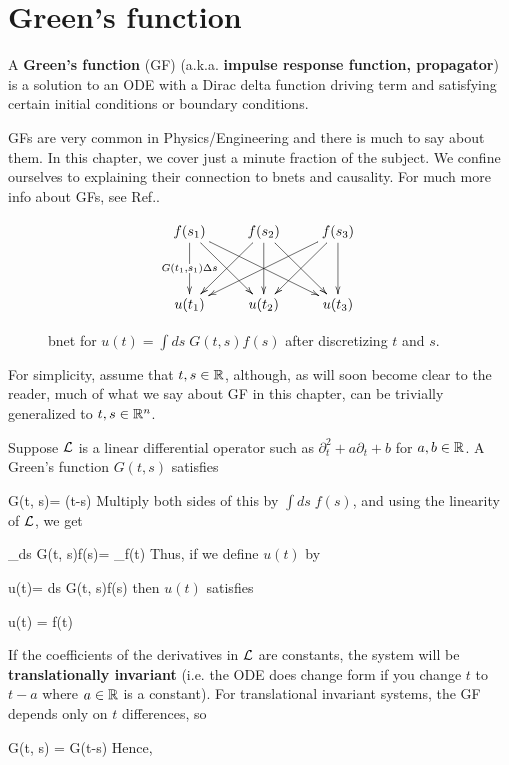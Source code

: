 \chapter{Green's function}
\label{ch-greens-fun}


A {\bf Green's function} (GF)
(a.k.a. {\bf impulse response
 function, propagator}) is a solution to an ODE 
 with a Dirac delta function driving term and satisfying certain
 initial conditions or boundary conditions. 
 
GFs are very common in Physics/Engineering and there is much
to say about them. In this chapter, we cover
just a minute fraction of the subject. We confine ourselves
to explaining their connection to bnets  and causality.
For much more info about GFs, see Ref.\cite{wiki-greens-fun}.

\begin{figure}[h!]
$$
\xymatrix@R=3pc{
f(s_1)\ar[d]|{G(t_1, s_1)\Delta s}
\ar[dr]\ar[drr]
&f(s_2)\ar[dl]\ar[d]\ar[dr]
&f(s_3)\ar[dll]\ar[dl]\ar[d]
\\
u(t_1)
&u(t_2)
&u(t_3)
}$$
\caption{bnet for 
$u(t)=  \int ds\; G(t, s)f(s)$
after discretizing $t$ and $s$.}
\label{eq-bnet-greens-fun}
\end{figure}

For simplicity, assume that $t, s\in { \mathbb{R}}$,
although, as will soon become clear to the reader,
much of what we say
about GF in this chapter,
can be trivially 
generalized to $t, s\in { \mathbb{R}}^n$.

Suppose ${\cal L}$ is a 
linear differential operator such as $\partial^2_t + a\partial_t + b$ for $a,b\in{ \mathbb{R}}$.
A Green's function $G(t,s)$ satisfies

\beq
\call G(t, s)= \delta(t-s)
\eeq
Multiply both sides of this by $\int ds\; f(s)$,
and using the linearity of ${\cal L}$, we get


\beq
{}_{\call\int ds\; G(t, s)f(s)}= 
_{f(t)}
\eeq
Thus, if we define $u(t)$ by

\beq
u(t)=  \int ds\; G(t, s)f(s)
\eeq
then $u(t)$ satisfies

\beq 
\call u(t) = f(t)
\eeq

If the coefficients of the derivatives in ${\cal L}$
are constants, the system will be {\bf translationally
invariant} (i.e. the ODE does change
form if you change $t$ to $t-a$ where
$a\in{ \mathbb{R}}$ is a constant).
For translational invariant systems,
the GF depends only on $t$ differences, so

\beq
G(t, s) = G(t-s)
\eeq
Hence, 

